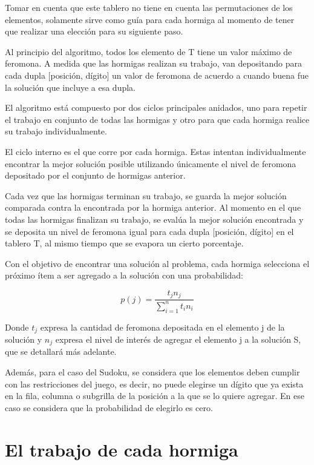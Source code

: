 \documentclass[a4paper,spanish]{article}
\begin{document}
Tomar en cuenta que este tablero no tiene en cuenta las permutaciones de los elementos, solamente sirve como guía 
para cada hormiga al momento de tener que realizar una elección para su siguiente paso.

Al principio del algoritmo, todos los elemento de T tiene un valor máximo de feromona. A medida que las hormigas
realizan su trabajo, van depositando para cada dupla [posición, dígito] un valor de feromona de acuerdo a cuando buena fue
la solución que incluye a esa dupla.

El algoritmo está compuesto por dos ciclos principales anidados, uno para repetir el trabajo en conjunto 
de todas las hormigas y otro para que cada hormiga realice su trabajo individualmente.

El ciclo interno es el que corre por cada hormiga. Estas intentan individualmente encontrar 
la mejor solución posible utilizando únicamente el nivel de feromona depositado por el conjunto de hormigas anterior. 

Cada vez que las hormigas terminan su trabajo, se guarda la mejor solución comparada contra la encontrada por la hormiga anterior. 
Al momento en el que todas las hormigas finalizan su trabajo, se evalúa la mejor solución encontrada y se deposita un nivel de 
feromona igual para cada dupla [posición, dígito] en el tablero T, al mismo tiempo que se evapora un cierto porcentaje.

Con el objetivo de encontrar una solución al problema, cada hormiga selecciona el próximo ítem 
a ser agregado a la solución con una probabilidad:

\begin{equation}
	p(j) = \dfrac{t_j n_j}{\sum\limits_{i=1}^n t_i n_i}
\end{equation}

Donde $t_j$ expresa la cantidad de feromona depositada en el elemento j de la solución y $n_j$ expresa el nivel de interés de agregar 
el elemento j a la solución S, que se detallará más adelante.

Además, para el caso del Sudoku, se considera que los elementos deben cumplir con las restricciones del juego, es decir, 
no puede elegirse un dígito que ya exista en la fila, columna o subgrilla de la posición a la que se lo quiere agregar. 
En ese caso se considera que la probabilidad de elegirlo es cero.

\section{El trabajo de cada hormiga}
\end{document}
